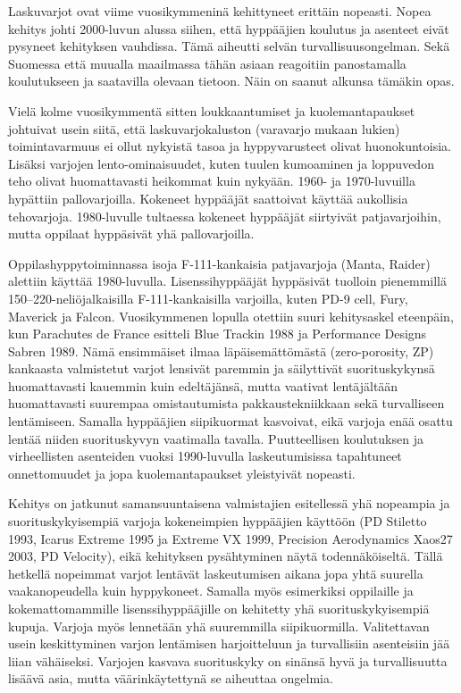 
Laskuvarjot ovat viime vuosikymmeninä kehittyneet erittäin nopeasti. Nopea kehitys johti 2000-luvun alussa siihen, että hyppääjien koulutus ja asenteet eivät pysyneet kehityksen vauhdissa. Tämä aiheutti selvän turvallisuusongelman. Sekä Suomessa että muualla maailmassa tähän asiaan reagoitiin panostamalla koulutukseen ja saatavilla olevaan tietoon. Näin on saanut alkunsa tämäkin opas. 


Vielä kolme vuosikymmentä sitten loukkaantumiset ja kuolemantapaukset johtuivat usein siitä, että laskuvarjokaluston (varavarjo mukaan lukien) toimintavarmuus ei ollut nykyistä tasoa ja hyppyvarusteet olivat huonokuntoisia. Lisäksi varjojen lento-ominaisuudet, kuten tuulen kumoaminen ja loppuvedon teho olivat huomattavasti heikommat kuin nykyään. 1960- ja 1970-luvuilla hypättiin pallovarjoilla. Kokeneet hyppääjät saattoivat käyttää aukollisia tehovarjoja. 1980-luvulle tultaessa kokeneet hyppääjät siirtyivät patjavarjoihin, mutta oppilaat hyppäsivät yhä pallovarjoilla.  


Oppilashyppytoiminnassa isoja F-111-kankaisia patjavarjoja (Manta, Raider) alettiin käyttää 1980-luvulla. Lisenssihyppääjät hyppäsivät tuolloin pienemmillä 150–220-neliöjalkaisilla F-111-kankaisilla varjoilla, kuten PD-9 cell, Fury, Maverick ja Falcon. Vuosikymmenen lopulla otettiin suuri kehitysaskel eteenpäin, kun Parachutes de France esitteli Blue Trackin 1988 ja Performance Designs Sabren 1989. Nämä ensimmäiset ilmaa läpäisemättömästä (zero-porosity, ZP) kankaasta valmistetut varjot lensivät paremmin ja säilyttivät suorituskykynsä huomattavasti kauemmin kuin edeltäjänsä, mutta vaativat lentäjältään huomattavasti suurempaa omistautumista pakkaustekniikkaan sekä turvalliseen lentämiseen. Samalla hyppääjien siipikuormat kasvoivat, eikä varjoja enää osattu lentää niiden suorituskyvyn vaatimalla tavalla. Puutteellisen koulutuksen ja virheellisten asenteiden vuoksi 1990-luvulla laskeutumisissa tapahtuneet onnettomuudet ja jopa kuolemantapaukset yleistyivät nopeasti. 


Kehitys on jatkunut samansuuntaisena valmistajien esitellessä yhä nopeampia ja suorituskykyisempiä varjoja kokeneimpien hyppääjien käyttöön (PD Stiletto 1993, Icarus Extreme 1995 ja Extreme VX 1999, Precision Aerodynamics Xaos27 2003, PD Velocity), eikä kehityksen pysähtyminen näytä todennäköiseltä. Tällä hetkellä nopeimmat varjot lentävät laskeutumisen aikana jopa yhtä suurella vaakanopeudella kuin hyppykoneet. Samalla myös esimerkiksi oppilaille ja kokemattomammille lisenssihyppääjille on kehitetty yhä suorituskykyisempiä kupuja. Varjoja myös lennetään yhä suuremmilla siipikuormilla. Valitettavan usein keskittyminen varjon lentämisen harjoitteluun ja turvallisiin asenteisiin jää liian vähäiseksi. Varjojen kasvava suorituskyky on sinänsä hyvä ja turvallisuutta lisäävä asia, mutta väärinkäytettynä se aiheuttaa ongelmia.  


